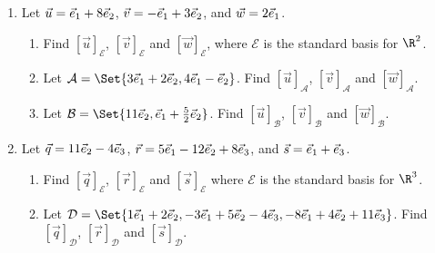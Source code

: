 \begin{exercises}

	\begin{problist}
		\prob
		\begin{enumerate}
			\item Let $\vec u={\vec e_1}+8{\vec e_2}$, $\vec v=-{\vec e_1}+ 3{\vec e_2}$,
				and $\vec w=2{\vec e_1}$.


				\begin{enumerate}
					\item Find $[\vec u]_{\mathcal E}$,
						$[\vec v]_{\mathcal E}$ and
						$[\vec w]_{\mathcal E}$, where $\mathcal
						E$ is the standard basis for $\R^{2}$.

					\item Let $\mathcal A=\Set{3\xhat+2\yhat,4\xhat-\yhat}$.
						Find $[\vec u]_{\mathcal A}$, $[\vec
						v]_{\mathcal A}$ and $[\vec w]_{\mathcal
						A}$.

					\item Let $\mathcal B=\Set{11\yhat,\xhat+\frac{5}{2}\yhat}$.
						Find $[\vec u]_{\mathcal B}$, $[\vec
						v]_{\mathcal B}$ and $[\vec w]_{\mathcal
						B}$.
				\end{enumerate}

			\item Let $\vec q=11{\vec e_2}-4{\vec e_3}$,
				$\vec r=5{\vec e_1}-12{\vec e_2}+8{\vec e_3}$, and $\vec s={\vec e_1}+{\vec e_3}$.


				\begin{enumerate}
					\item Find $[\vec q]_{\mathcal E}$,
						$[\vec r]_{\mathcal E}$ and
						$[\vec s]_{\mathcal E}$ where
						$\mathcal E$ is the standard
						basis for $\R^{3}$.

					\item Let $\mathcal D=\Set{1\xhat+2\yhat,-3\xhat+5\yhat-4\zhat,-8\xhat+4\yhat+11\zhat}$.
						Find $[\vec q]_{\mathcal D}$, $[\vec
						r]_{\mathcal D}$ and $[\vec s]_{\mathcal
						D}$.


\end{enumerate}
\end{enumerate}
\end{problist}
\end{exercises}
